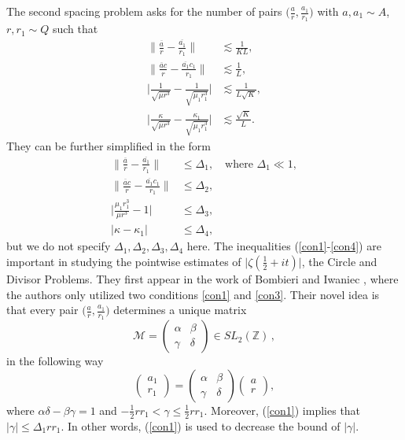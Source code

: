 \documentclass[11pt]{amsart}
\numberwithin{equation}{section}
\theoremstyle{definition}
\theoremstyle{proposition}
\begin{document}
The second spacing problem asks for the number of pairs $\Big(\frac{a}{r}, \frac{a_1}{r_1}\Big)$ with $a,a_1\sim A$, $r,r_1\sim Q$ such that 
\begin{align}
\Big\|\frac{\overline{a}}{r}-\frac{\overline{a_1}}{r_1} \Big\| & \lesssim \frac{1}{KL},    
\\ \Big\|\frac{\overline{a}c}{r}-\frac{\overline{a_1}c_1}{r_1} \Big\| & \lesssim \frac{1}{L},    
\\ \Big| \frac{1}{\sqrt{\mu r^3}}-\frac{1}{\sqrt{\mu_1 r_1^3}} \Big| & \lesssim \frac{1}{L\sqrt{K}},  
\\ \Big| \frac{\kappa}{\sqrt{\mu r^3}}-\frac{\kappa_1}{\sqrt{\mu_1 r_1^3}} \Big| & \lesssim \frac{\sqrt{K}}{L}. 
\end{align}
They can be further simplified in the form 
\begin{align}
\Big\|\frac{\overline{a}}{r}-\frac{\overline{a_1}}{r_1} \Big\| & \le \Delta_1,  \quad \text{where }\Delta_1 \ll 1,  \label{con1}
\\ \Big\|\frac{\overline{a}c}{r}-\frac{\overline{a_1}c_1}{r_1} \Big\| & \le \Delta_2,   \label{con2}
\\ \Big| \frac{\mu_1 r_1^3}{\mu r^3} -1 \Big| & \le \Delta_3,   \label{con3}
\\ | \kappa-\kappa_1 | & \le \Delta_4,  \label{con4}
\end{align}
but we do not specify $\Delta_1,\Delta_2,\Delta_3,\Delta_4$ here. The inequalities (\eqref{con1}-\eqref{con4}) are important in studying the pointwise estimates of $\Big|\zeta(\frac{1}{2}+it)\Big|$, the Circle and Divisor Problems. They first appear in the work of Bombieri and Iwaniec \cite{BombieriIwaniec}, where the authors only utilized two conditions \eqref{con1} and \eqref{con3}. Their novel idea is that every pair $\Big(\frac{a}{r}, \frac{a_1}{r_1}\Big)$ determines a unique matrix
\[
\mathcal{M}=\begin{pmatrix}
\alpha & \beta \\
\gamma & \delta
\end{pmatrix} \in SL_2(\mathbb Z)  \,,
\]
in the following way
\begin{equation}  \label{mtx equa}
\begin{pmatrix}
 a_1 \\ r_1    
\end{pmatrix}=\begin{pmatrix}
\alpha & \beta \\
\gamma & \delta
\end{pmatrix} \begin{pmatrix}
 a \\ r    
\end{pmatrix},   
\end{equation}
where $\alpha\delta-\beta\gamma=1$ and   $-\frac{1}{2}r r_1 < \gamma \le \frac{1}{2}rr_1$.  Moreover, (\ref{con1})
implies that $|\gamma|\leq \Delta_1rr_1$. In other words, (\ref{con1}) is used to decrease the bound of $|\gamma|$.\\
\end{document}
